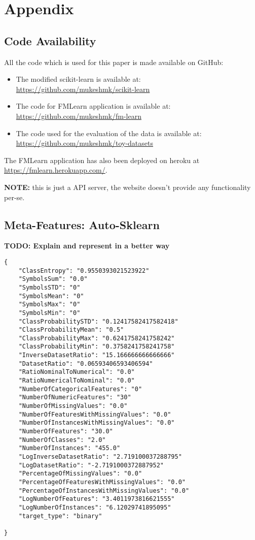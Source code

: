 \chapter{Appendix}
\section{Code Availability}
All the code which is used for this paper is made available on GitHub:
\begin{itemize}
    \item The modified scikit-learn is available at: \newline \href{https://github.com/mukeshmk/scikit-learn}{https://github.com/mukeshmk/scikit-learn}
    \item The code for FMLearn application is available at: \newline \href{https://github.com/mukeshmk/fm-learn}{https://github.com/mukeshmk/fm-learn}
    \item The code used for the evaluation of the data is available at: \newline \href{https://github.com/mukeshmk/toy-datasets}{https://github.com/mukeshmk/toy-datasets}
\end{itemize}
The FMLearn application has also been deployed on heroku at \href{https://fmlearn.herokuapp.com/}{https://fmlearn.herokuapp.com/}. 

\textbf{NOTE:} this is just a API server, the website doesn't provide any functionality per-se.

\section{Meta-Features: Auto-Sklearn}
\label{meta-features-ask}

\textbf{TODO: Explain and represent in a better way}

\begin{lstlisting}
{
	"ClassEntropy": "0.9550393021523922"
    "SymbolsSum": "0.0"
    "SymbolsSTD": "0"
    "SymbolsMean": "0"
    "SymbolsMax": "0"
    "SymbolsMin": "0"
    "ClassProbabilitySTD": "0.12417582417582418"
    "ClassProbabilityMean": "0.5"
    "ClassProbabilityMax": "0.6241758241758242"
    "ClassProbabilityMin": "0.3758241758241758"
    "InverseDatasetRatio": "15.166666666666666"
    "DatasetRatio": "0.06593406593406594"
    "RatioNominalToNumerical": "0.0"
    "RatioNumericalToNominal": "0.0"
    "NumberOfCategoricalFeatures": "0"
    "NumberOfNumericFeatures": "30"
    "NumberOfMissingValues": "0.0"
    "NumberOfFeaturesWithMissingValues": "0.0"
    "NumberOfInstancesWithMissingValues": "0.0"
    "NumberOfFeatures": "30.0"
    "NumberOfClasses": "2.0"
    "NumberOfInstances": "455.0"
    "LogInverseDatasetRatio": "2.719100037288795"
    "LogDatasetRatio": "-2.7191000372887952"
    "PercentageOfMissingValues": "0.0"
    "PercentageOfFeaturesWithMissingValues": "0.0"
    "PercentageOfInstancesWithMissingValues": "0.0"
    "LogNumberOfFeatures": "3.4011973816621555"
    "LogNumberOfInstances": "6.12029741895095"
    "target_type": "binary"

}
\end{lstlisting}